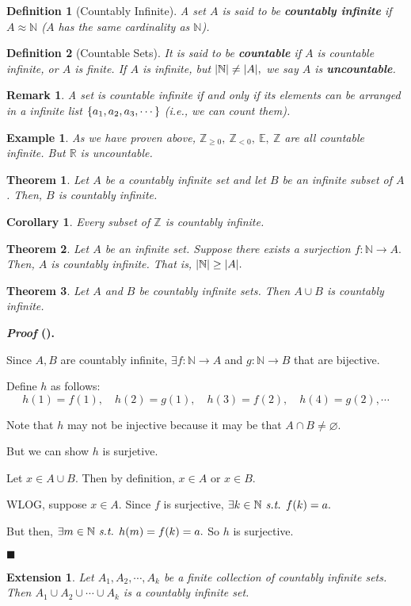 \documentclass[12pt,a4paper]{article}
\newtheorem{thm}{Theorem}[subsection]
\newtheorem{df}{Definition}[subsection]
\newtheorem{eg}{Example}[subsection]
\newtheorem{cor}{Corollary}[section]
\newcounter{nprf}[subsection]
\newtheorem*{rmk}{\indent Remark}
\newenvironment*{prf}{\par\indent\textbf{\textit{Proof} (\stepcounter{nprf}\thenprf). }\par }{\par\hfill $\blacksquare$\par}
\newtheorem*{ext}{\indent Extension}
\def\Z{{\mathbb{Z}}}
\def\R{{\mathbb{R}}}
\def\N{{\mathbb{N}}}
\def\E{{\mathbb{E}}}
\def\emptyset{\varnothing}
\def\st{\emph{ s.t. }}
\begin{document}
\begin{df}[Countably Infinite]
	A set $A$ is said to be \textbf{countably infinite} if $A\approx\N$ ($A$ has the same cardinality as $\N$). 
\end{df}
\begin{df}[Countable Sets]
It is said to be \textbf{countable} if $A$ is countable infinite, or $A$ is finite. If $A$ is infinite, but $\qty|\N|\neq\qty|A|,$ we say $A$ is \textbf{uncountable}.
\end{df}
\begin{rmk}
A set is countable infinite if and only if its elements can be arranged in a infinite list $\qty{a_1,a_2,a_3,\cdots}$ (i.e., we can count them).	
\end{rmk}
\begin{eg}
	As we have proven above, $\Z_{\geq0},\ \Z_{<0},\ \E,\ \Z$ are all countable infinite. But $\R$ is uncountable. 	
\end{eg}
\begin{thm}
	Let $A$ be a countably infinite set and let $B$ be an infinite subset of $A$. Then, $B$ is countably infinite. 	
\end{thm}
\begin{cor}
	Every subset of $\Z$ is countably infinite. 	
\end{cor}
\begin{thm}
	Let $A$	be an infinite set. Suppose there exists a surjection $f:\N\to A.$ Then, $A$ is countably infinite. That is, $\qty|\N|\geq\qty|A|.$
\end{thm}
\begin{framed}
\begin{thm}
	Let $A$ and $B$	be countably infinite sets. Then $A\cup B$ is countably infinite. 
\end{thm}
\begin{prf}
	Since $A,B$ are countably infinite, $\exists f:\N\to A$ and $g:\N\to B$ that are bijective. \par [WTS: $\exists h:\N\to A\cup B$ that is bijective]\par Define $h$ as follows: \[h(1)=f(1),\quad h(2)=g(1),\quad h(3)=f(2),\quad h(4)=g(2),\cdots\]\par Note that $h$ may not be injective because it may be that $A\cap B\neq\emptyset.$\par But we can show $h$ is surjetive.\par Let $x\in A\cup B.$ Then by definition, $x\in A$ or $x\in B.$\par WLOG, suppose $x\in A.$ Since $f$ is surjective, $\exists k\in\N\st f(k)=a.$\par But then, $\exists m\in\N\st h(m)=f(k)=a.$ So $h$ is surjective.
\end{prf}
\begin{ext}
	Let $A_1,A_2,\cdots,A_k$ be a finite collection of countably infinite sets. Then $A_1\cup A_2\cup\cdots\cup A_k$ is a countably infinite set. 
\end{ext}
\end{framed}
\end{document}
